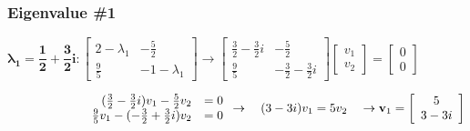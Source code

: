 \documentclass[12pt]{article}
\begin{document}
\begin{enumerate}
    \subsubsection*{Eigenvalue \#1}
    $\mathbf{\lambda_1 = \dfrac{1}{2}+\dfrac{3}{2}i}: 
    \left[\begin{array}{cc} 2 - \lambda_1 & -\frac{5}{2}\\ \frac{9}{5} & -1 - \lambda_1\end{array}\right]
    \rightarrow \left[\begin{array}{cc} \frac{3}{2}-\frac{3}{2}i& -\frac{5}{2}\\ \frac{9}{5} & -\frac{3}{2}-\frac{3}{2}i \end{array}\right] \left[\begin{array}{cc} v_1 \\ v_2 \end{array}\right] = \left[\begin{array}{cc} 0 \\ 0 \end{array}\right]$

    $\hspace*{2.2cm}\begin{array}{rr} (\frac{3}{2}-\frac{3}{2}i)v_1 - \frac{5}{2}v_2 &=0 \\ \frac{9}{5}v_1 - (-\frac{3}{2}+\frac{3}{2}i)v_2 &=0 \end{array} 
     \rightarrow \quad (3-3i)v_1=5v_2 \quad \rightarrow \mathbf{v}_1 =\left[\begin{array}{cc} 5 \\ 3-3i \end{array}\right]$


\end{enumerate}
\end{document}
